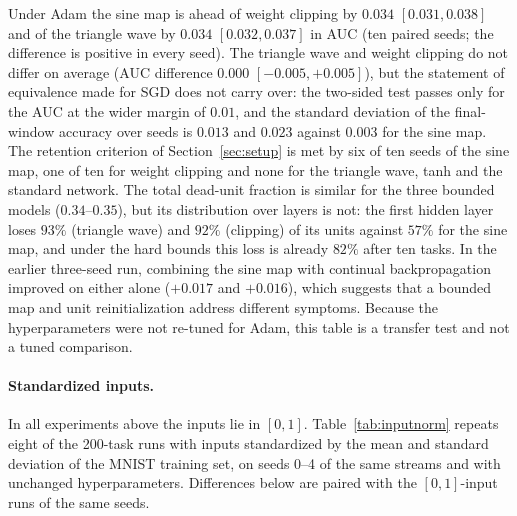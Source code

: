 \documentclass[11pt,a4paper]{article}
\begin{document}
Under Adam the sine map is ahead of weight clipping by $0.034$ $[0.031,0.038]$ and of the triangle wave by
$0.034$ $[0.032,0.037]$ in AUC (ten paired seeds; the difference is positive in every seed). The triangle wave
and weight clipping do not differ on average (AUC difference $0.000$ $[-0.005,+0.005]$), but the statement of
equivalence made for SGD does not carry over: the two-sided test passes only for the AUC at the wider margin
of $0.01$, and the standard deviation of the final-window accuracy over seeds is $0.013$ and $0.023$ against
$0.003$ for the sine map. The retention criterion of Section~\ref{sec:setup} is met by six of ten seeds of
the sine map, one of ten for weight clipping and none for the triangle wave, tanh and the standard network.
The total dead-unit fraction is similar for the three bounded models ($0.34$--$0.35$), but its distribution
over layers is not: the first hidden layer loses $93\%$ (triangle wave) and $92\%$ (clipping) of its units
against $57\%$ for the sine map, and under the hard bounds this loss is already $82\%$ after ten tasks. In the
earlier three-seed run, combining the sine map with continual backpropagation improved on either alone
($+0.017$ and $+0.016$), which suggests that a bounded map and unit reinitialization address different
symptoms. Because the hyperparameters were not re-tuned for Adam, this table is a transfer test and not a
tuned comparison.

\paragraph{Standardized inputs.} In all experiments above the inputs lie in $[0,1]$. Table~\ref{tab:inputnorm}
repeats eight of the 200-task runs with inputs standardized by the mean and standard deviation of the MNIST
training set, on seeds 0--4 of the same streams and with unchanged hyperparameters. Differences below are
paired with the $[0,1]$-input runs of the same seeds.
\end{document}
